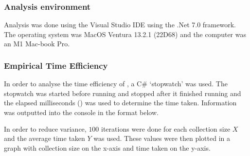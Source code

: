 \documentclass[a4paper]{article}
\begin{document}





\subsubsection{Analysis environment}
Analysis was done using the Visual Studio IDE using the $.$Net 7.0 framework. The operating system was MacOS Ventura 13.2.1 (22D68) and the computer was an M1 Mac-book Pro.

\subsubsection{Empirical Time Efficiency}
In order to analyse the time efficiency of , a C\# `stopwatch' was used. The stopwatch was started before running  and stopped after it finished running and the elapsed milliseconds () was used to determine the time taken. Information was outputted into the console in the format below.
\begin{center}
\end{center}

In order to reduce variance, $100$ iterations were done for each collection size $X$ and the average time taken $Y$ was used. These values were then plotted in a graph with collection size on the x-axis and time taken on the y-axis.
\vspace{3mm}
\end{document}

